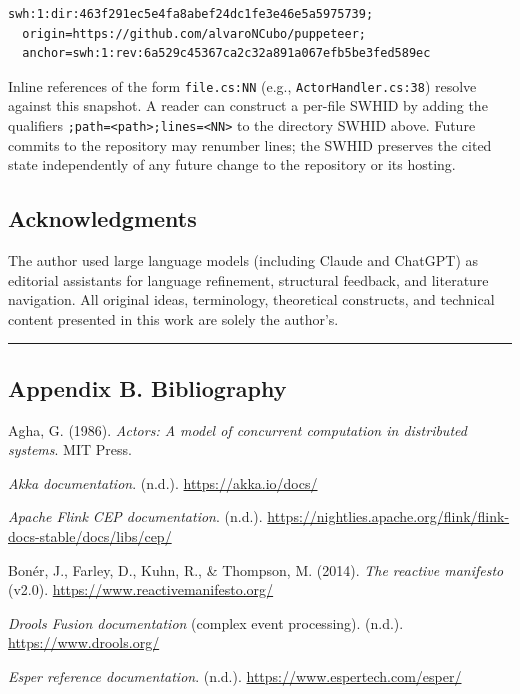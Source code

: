 \documentclass[
]{article}
\let\origtexttt\texttt%
\renewcommand{\texttt}[1]{\origtexttt{\seqsplit{#1}}}%
\let\texttt\origtexttt%
\begin{document}
\begin{verbatim}
swh:1:dir:463f291ec5e4fa8abef24dc1fe3e46e5a5975739;
  origin=https://github.com/alvaroNCubo/puppeteer;
  anchor=swh:1:rev:6a529c45367ca2c32a891a067efb5be3fed589ec
\end{verbatim}

Inline references of the form \texttt{file.cs:NN} (e.g.,
\texttt{ActorHandler.cs:38}) resolve against this snapshot. A reader can
construct a per-file SWHID by adding the qualifiers
\texttt{;path=\textless{}path\textgreater{};lines=\textless{}NN\textgreater{}}
to the directory SWHID above. Future commits to the repository may
renumber lines; the SWHID preserves the cited state independently of any
future change to the repository or its hosting.

\subsection{Acknowledgments}\label{acknowledgments}

The author used large language models (including Claude and ChatGPT) as
editorial assistants for language refinement, structural feedback, and
literature navigation. All original ideas, terminology, theoretical
constructs, and technical content presented in this work are solely the
author's.

\begin{center}\rule{0.5\linewidth}{0.5pt}\end{center}

\subsection{Appendix B. Bibliography}\label{appendix-b.-bibliography}

Agha, G. (1986). \emph{Actors: A model of concurrent computation in
distributed systems}. MIT Press.

\emph{Akka documentation}. (n.d.). \url{https://akka.io/docs/}

\emph{Apache Flink CEP documentation}. (n.d.).
\url{https://nightlies.apache.org/flink/flink-docs-stable/docs/libs/cep/}

Bonér, J., Farley, D., Kuhn, R., \& Thompson, M. (2014). \emph{The
reactive manifesto} (v2.0). \url{https://www.reactivemanifesto.org/}

\emph{Drools Fusion documentation} (complex event processing). (n.d.).
\url{https://www.drools.org/}

\emph{Esper reference documentation}. (n.d.).
\url{https://www.espertech.com/esper/}
\end{document}
